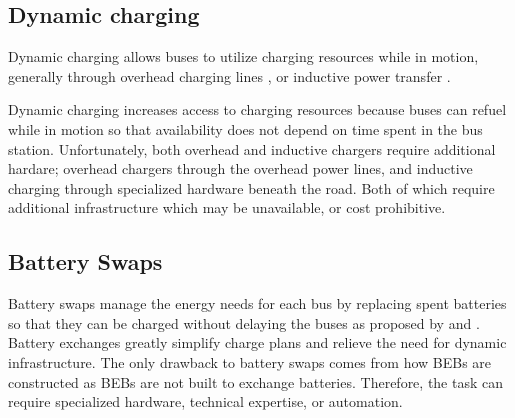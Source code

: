 \subsection{Dynamic charging}
\par Dynamic charging allows buses to utilize charging resources while in motion, generally through overhead charging lines \cite{csonka_optimization_2021}, or inductive power transfer \cite{jeong_automatic_2018} \cite{balde_electric_2019}. 
\par Dynamic charging increases access to charging resources because buses can refuel while in motion so that availability does not depend on time spent in the bus station. Unfortunately, both overhead and inductive chargers require additional hardare; overhead chargers through the overhead power lines, and inductive charging through specialized hardware beneath the road. Both of which require additional infrastructure \cite{Alwesabi_2022_Robust} which may be unavailable, or cost prohibitive.
\subsection{Battery Swaps}
\par Battery swaps manage the energy needs for each bus by replacing spent batteries so that they can be charged without delaying the buses as proposed by \cite{jain_battery_2020} and \cite{xian_zhang_optimal_2016}. Battery exchanges greatly simplify charge plans and relieve the need for dynamic infrastructure. The only drawback to battery swaps comes from how BEBs are constructed as BEBs are not built to exchange batteries. Therefore, the task can require specialized hardware, technical expertise, or automation.
